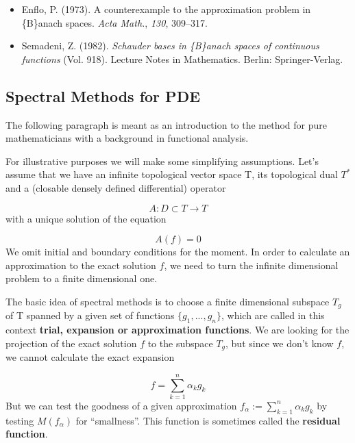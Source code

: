 \documentclass[preprint, 5p, 10pt]{elsarticle}
\theoremstyle{plain}
\begin{document}
\begin{itemize}%
\item Enflo, P. (1973). A counterexample to the approximation problem in \{B\}anach spaces. \emph{Acta Math.}, \emph{130}, 309--{}317.


\item Semadeni, Z. (1982). \emph{Schauder bases in \{B\}anach spaces of continuous functions} (Vol. 918). Lecture Notes in Mathematics. Berlin: Springer-Verlag.



\end{itemize}
\subsection{Spectral Methods for PDE}
The following paragraph is meant as an introduction to the method for pure mathematicians with a background in functional analysis.

For illustrative purposes we will make some simplifying assumptions. Let'{}s assume that we have an infinite topological vector space T, its topological dual $T^*$ and a (closable densely defined differential) operator

\begin{displaymath}
A: D \subset T \to T
\end{displaymath}
with a unique solution of the equation

\begin{displaymath}
A(f) = 0
\end{displaymath}
We omit initial and boundary conditions for the moment. In order to calculate an approximation to the exact solution $f$, we need to turn the infinite dimensional problem to a finite dimensional one.

The basic idea of spectral methods is to choose a finite dimensional subspace $T_g$ of T spanned by a given set of functions $\{g_1, ..., g_n \}$, which are called in this context \textbf{trial, expansion or approximation functions}. We are looking for the projection of the exact solution $f$ to the subspace $T_g$, but since we don'{}t know $f$, we cannot calculate the exact expansion

\begin{displaymath}
f = \sum_{k = 1}^n \alpha_k g_k
\end{displaymath}
But we can test the goodness of a given approximation $f_{\alpha} := \sum_{k = 1}^n \alpha_k g_k$ by testing $M(f_{\alpha})$ for ``{}smallness''{}. This function is sometimes called the \textbf{residual function}.
\end{document}

